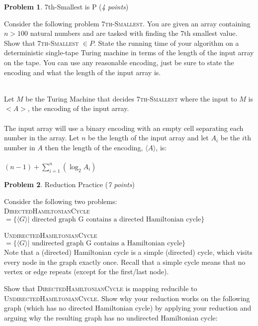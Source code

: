\documentclass[11pt]{article}
\theoremstyle{definition}
\theoremstyle{theorem}
\newtheorem{prob}{Problem}
\newcommand{\solution}{\medskip\noindent{\color{blue}\textbf{Solution:}}}
\begin{document}
\begin{enumerate}[label=(\alph*)]
\end{enumerate}


\newpage

\begin{prob} 7th-Smallest is P (\emph{4 points})\end{prob}

Consider the following problem \textsc{7th-Smallest}. You are given an array containing $n>100$ natural numbers and are tasked with finding the 7th smallest value. Show that \textsc{7th-Smallest} $\in P$. State the running time of your algorithm on a deterministic single-tape Turing machine in terms of the length of the input array on the tape. You can use any reasonable encoding, just be sure to state the encoding and what the length of the input array is.

\solution\\
Let $M$ be the Turing Machine that decides \textsc{7th-Smallest} where the input to $M$ is $<A>$, the encoding of the input array. \\~\\
The input array will use a binary encoding with an empty cell separating each number in the array. Let $n$ be the length of the input array and let $A_i$ be the $i$th number in $A$ then the length of the encoding, $\langle A \rangle$, is: \\~\\
$(n-1) + \sum\limits_{i=1}^n(\log_2A_i)$

\newpage

\begin{prob} Reduction Practice (\emph{7 points})\end{prob}

Consider the following two problems:\\

\textsc{DirectedHamiltonianCycle} $= \{ \langle G \rangle | \text{ directed graph G contains a directed Hamiltonian cycle} \}$

\textsc{UndirectedHamiltonianCycle} $= \{ \langle G \rangle | \text{ undirected graph G contains a Hamiltonian cycle} \}$\\

Note that a (directed) Hamiltonian cycle is a simple (directed) cycle, which visits every node in the graph exactly once. Recall that a simple cycle means that no vertex or edge repeats (except for the first/last node).

Show that \textsc{DirectedHamiltonianCycle} is mapping reducible to \textsc{UndirectedHamiltonianCycle}. Show why your reduction works on the following graph (which has no directed Hamiltonian cycle) by applying your reduction and arguing why the resulting graph has no undirected Hamiltonian cycle:
\end{document}
